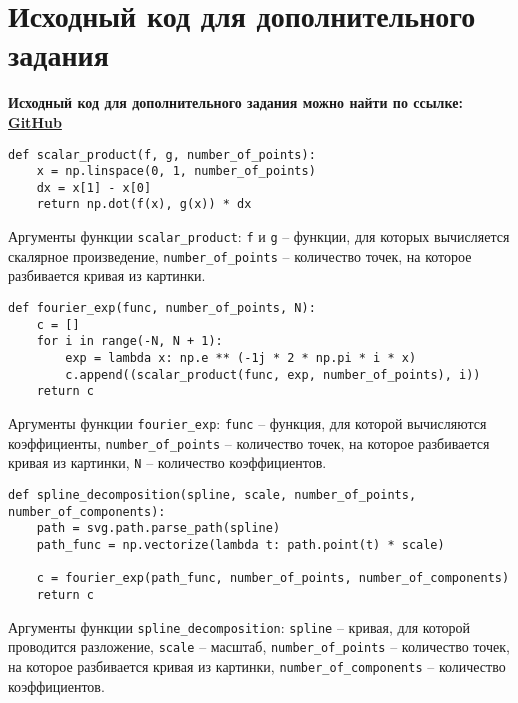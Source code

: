 \section{Исходный код для дополнительного задания}
\label{appendix:appendixB}

\textbf{Исходный код для дополнительного задания можно найти по ссылке: \href{https://github.com/edelwiw/FourierDrawing}{GitHub}} 

\begin{lstlisting}[style=python_white, caption={Скалярное произведение на интервале [1, 0]}, label=lst:scalar_product_cat, belowskip=-0.8\baselineskip]
def scalar_product(f, g, number_of_points):
    x = np.linspace(0, 1, number_of_points)
    dx = x[1] - x[0]
    return np.dot(f(x), g(x)) * dx
\end{lstlisting}
Аргументы функции \texttt{scalar\_product}: \texttt{f} и \texttt{g} -- функции, для которых вычисляется скалярное произведение, \texttt{number\_of\_points} -- количество точек, на которое разбивается кривая из картинки. 
\newline

\begin{lstlisting}[style=python_white, caption={Вычисление коэффициентов Фурье}, label=lst:fourier_cat, belowskip=-0.8\baselineskip]
def fourier_exp(func, number_of_points, N):
    c = []
    for i in range(-N, N + 1):
        exp = lambda x: np.e ** (-1j * 2 * np.pi * i * x)
        c.append((scalar_product(func, exp, number_of_points), i))
    return c
\end{lstlisting}
Аргументы функции \texttt{fourier\_exp}: \texttt{func} -- функция, для которой вычисляются коэффициенты, \texttt{number\_of\_points} -- количество точек, на которое разбивается кривая из картинки, \texttt{N} -- количество коэффициентов.
\newline

\begin{lstlisting}[style=python_white, caption={Разложение линии по Фурье}, label=lst:spline_decomposition, belowskip=-0.8\baselineskip]
def spline_decomposition(spline, scale, number_of_points, number_of_components):
    path = svg.path.parse_path(spline)
    path_func = np.vectorize(lambda t: path.point(t) * scale)

    c = fourier_exp(path_func, number_of_points, number_of_components)
    return c
\end{lstlisting}
Аргументы функции \texttt{spline\_decomposition}: \texttt{spline} -- кривая, для которой проводится разложение, \texttt{scale} -- масштаб, \texttt{number\_of\_points} -- количество точек, на которое разбивается кривая из картинки, \texttt{number\_of\_components} -- количество коэффициентов.
\newline

